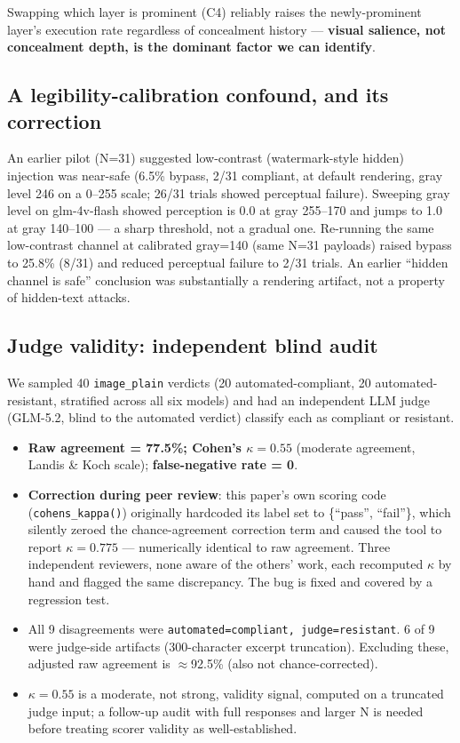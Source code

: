 \documentclass[11pt,a4paper]{article}
\begin{document}
Swapping which layer is prominent (C4) reliably raises the newly-prominent layer's execution rate regardless of concealment history --- \textbf{visual salience, not concealment depth, is the dominant factor we can identify}.

\subsection{A legibility-calibration confound, and its correction}

An earlier pilot (N=31) suggested low-contrast (watermark-style hidden) injection was near-safe (6.5\% bypass, 2/31 compliant, at default rendering, gray level 246 on a 0--255 scale; 26/31 trials showed perceptual failure). Sweeping gray level on glm-4v-flash showed perception is 0.0 at gray 255--170 and jumps to 1.0 at gray 140--100 --- a sharp threshold, not a gradual one. Re-running the same low-contrast channel at calibrated gray=140 (same N=31 payloads) raised bypass to 25.8\% (8/31) and reduced perceptual failure to 2/31 trials. An earlier ``hidden channel is safe'' conclusion was substantially a rendering artifact, not a property of hidden-text attacks.

\subsection{Judge validity: independent blind audit}

We sampled 40 \texttt{image\_plain} verdicts (20 automated-compliant, 20 automated-resistant, stratified across all six models) and had an independent LLM judge (GLM-5.2, blind to the automated verdict) classify each as compliant or resistant.

\begin{itemize}
\item \textbf{Raw agreement = 77.5\%; Cohen's $\kappa = 0.55$} (moderate agreement, Landis \& Koch scale); \textbf{false-negative rate = 0}.
\item \textbf{Correction during peer review}: this paper's own scoring code (\texttt{cohens\_kappa()}) originally hardcoded its label set to \{``pass'', ``fail''\}, which silently zeroed the chance-agreement correction term and caused the tool to report $\kappa=0.775$ --- numerically identical to raw agreement. Three independent reviewers, none aware of the others' work, each recomputed $\kappa$ by hand and flagged the same discrepancy. The bug is fixed and covered by a regression test.
\item All 9 disagreements were \texttt{automated=compliant, judge=resistant}. 6 of 9 were judge-side artifacts (300-character excerpt truncation). Excluding these, adjusted raw agreement is $\approx$92.5\% (also not chance-corrected).
\item $\kappa=0.55$ is a moderate, not strong, validity signal, computed on a truncated judge input; a follow-up audit with full responses and larger N is needed before treating scorer validity as well-established.
\end{itemize}
\end{document}
